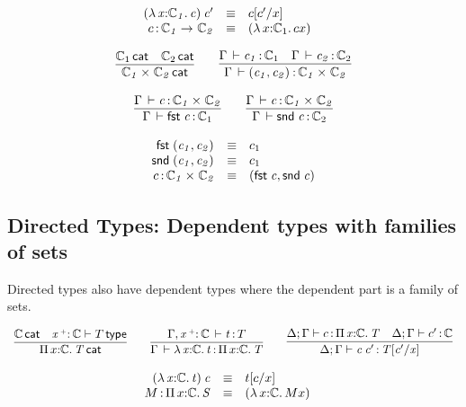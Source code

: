 \documentclass[11pt]{article}
\theoremstyle{plain}
\begin{document}
\[
\begin{array}{rcll}
\mathit{({\lambda\,x \mathit{:} \mathbb{C}_1.\,c}) \: c'} & \equiv & c [ c' / x ] \\
c \, \mathit{:} \, \mathit{\mathbb{C}_1}\rightarrow_{\mathit{}} \mathit{\mathbb{C}_2} & \equiv & {({\lambda\,x \mathit{:} \mathbb{C}_1.\,c}{x})} &
\end{array} \\
\]

\[
\begin{array}{c}
\infer{\wfdtp{\prd{\C_1}{\C_2}}}
      {\wfdtp{\C_1} &
        \wfdtp{\C_2}}
\qquad
\infer{\ofdtp{\Gamma}{\pair{c_1}{c_2}}{\prd {\C_1} {\C_2}}}
      {\ofdtp{\Gamma}{c_1}{\C_1} &
       \ofdtp{\Gamma}{c_2}{\C_2}}
\\ \\
\infer{\ofdtp{\Gamma}{\fst c}{\C_1}}
      {\ofdtp{\Gamma}{c}{\prd{\C_1}{\C_2}}}
\qquad
\infer{\ofdtp{\Gamma}{\snd c}{\C_2}}
      {\ofdtp{\Gamma}{c}{\prd{\C_1}{\C_2}}}
\end{array}
\]

\[
\begin{array}{rcll}
\mathit{\mathsf{fst}_{} \: \mathit{(c_1,c_2)_{}}} & \equiv & c_1 \\
\mathit{\mathsf{snd}_{} \: \mathit{(c_1,c_2)_{}}} & \equiv & c_1 \\
c \, \mathit{:} \, \mathit{\mathbb{C}_1} \times_{\mathit{}} \mathit{\mathbb{C}_2} & \equiv & \mathit{(\mathit{\mathsf{fst}_{} \: c},\mathit{\mathsf{snd}_{} \: c})_{}}
\end{array}
\]

\subsection{Directed Types: Dependent types with families of sets}

Directed types also have dependent types where the dependent part is a
family of sets.  

\[
\begin{array}{c}
\infer{\wfdtp{\picl{x}{\C}{T}}}
      {\wfdtp{\C} &
       \wftp{\vptptm{x}{\co}{\C}}{T}}
\qquad
\infer{\ofdtp{\Gamma}{\lam{x}{\C}{t}}{\picl x \C T}}
      {\oftp{\Gamma,\vtptm{x}{\co}{\C}}{t}{T}}
\qquad
\infer{\oftpsf{\Delta}{\Gamma}{\app c {c'}}{\subst T {c'} x}}
      {\oftpc{\Delta}{\Gamma}{c}{\picl{x}{\C}{T}} &
        \oftpsf{\Delta}{\Gamma}{c'}{\C}}
\end{array}
\]

\[
\begin{array}{rcll}
\mathit{({\lambda\,x \mathit{:} \mathbb{C}.\,t}) \: c} & \equiv & t [ c / x ] \\
M \, \mathit{:} \, \textnormal{$\Pi$}\,x \mathit{:} \mathbb{C}.\,\mathit{S} & \equiv & {({\lambda\,x \mathit{:} \mathbb{C}.\,M}{x})} &
\end{array} \\
\]
\end{document}
